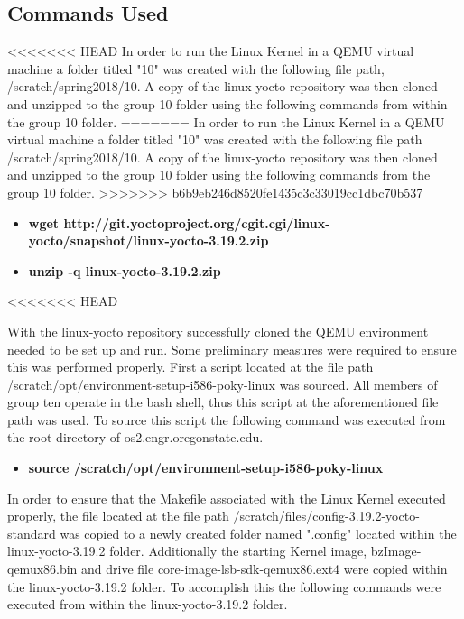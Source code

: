 \documentclass[10pt,onecolumn,draftclsnofoot]{IEEEtran} %
\begin{document}
\newpage
\begin{singlespace}
\section{\bf  Commands Used}

<<<<<<< HEAD
  \normalfont \indent In order to run the Linux Kernel in a QEMU virtual machine a folder titled "10" was created with the following file path, /scratch/spring2018/10. A copy of the linux-yocto repository was then cloned and unzipped to the group 10 folder using the following commands from within the group 10 folder.
=======
  \normalfont \indent In order to run the Linux Kernel in a QEMU virtual machine a folder titled "10" was created with the following file path /scratch/spring2018/10. A copy of the linux-yocto repository was then cloned and unzipped to the group 10 folder using the following commands from the group 10 folder.
\hfill\break
>>>>>>> b6b9eb246d8520fe1435c3c33019cc1dbc70b537

  \begin{itemize}
    \item \textbf{wget http://git.yoctoproject.org/cgit.cgi/linux-yocto/snapshot/linux-yocto-3.19.2.zip }
    \item \textbf{unzip -q linux-yocto-3.19.2.zip}
  \end{itemize}
<<<<<<< HEAD

  \normalfont \indent With the linux-yocto repository successfully cloned the QEMU environment needed to be set up and run. Some preliminary measures were required to ensure this was performed properly. First a script located at the file path /scratch/opt/environment-setup-i586-poky-linux was sourced. All members of group ten operate in the bash shell, thus this script at the aforementioned file path was used. To source this script the following command was executed from the root directory of os2.engr.oregonstate.edu.

  \begin{itemize}
    \item \textbf{source /scratch/opt/environment-setup-i586-poky-linux}
  \end{itemize}
  \normalfont \indent In order to ensure that the Makefile associated with the Linux Kernel executed properly, the file located at the file path /scratch/files/config-3.19.2-yocto-standard was copied to a newly created folder named ".config" located within the linux-yocto-3.19.2 folder. Additionally the starting Kernel image, bzImage-qemux86.bin and drive file core-image-lsb-sdk-qemux86.ext4 were copied within the linux-yocto-3.19.2 folder. To accomplish this the following commands were executed from within the linux-yocto-3.19.2 folder.


\end{singlespace}
\end{document}
